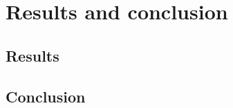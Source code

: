 \chapter{Results and conclusion}

\section{Results}
\label{sec:results}


\section{Conclusion}
\label{sec:conc}
